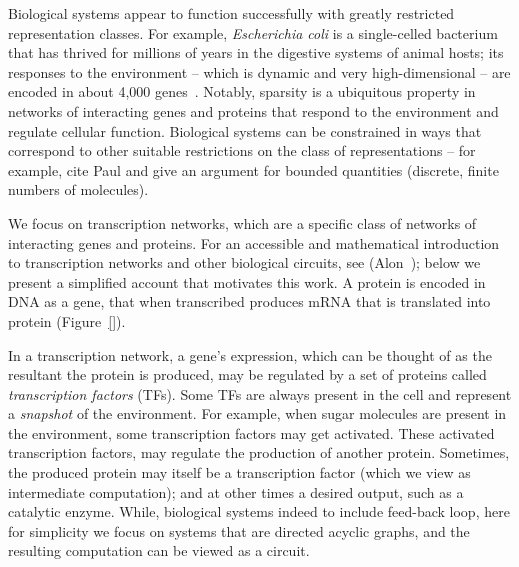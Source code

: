Biological systems appear to function successfully with greatly restricted
representation classes. For example, \emph{Escherichia coli} is a single-celled
bacterium that has thrived for millions of years in the digestive systems of
animal hosts; its responses to the environment -- which is dynamic and very
high-dimensional -- are encoded in about 4,000 genes~\cite{biology}. Notably,
sparsity is a ubiquitous property in networks of interacting genes and proteins
that respond to the environment and regulate cellular function.  Biological
systems can be constrained in ways that correspond to other suitable
restrictions on the class of representations -- for example, cite Paul and give
an argument for bounded quantities (discrete, finite numbers of molecules).

We focus on transcription networks, which are a specific class of networks of
interacting genes and proteins. For an accessible and mathematical introduction to
transcription networks and other biological circuits, see (Alon~\cite{alon});
below we present a simplified account that motivates this work. A protein is
encoded in DNA as a gene, that when transcribed produces mRNA that is translated
into protein (Figure~\ref{}).


In a transcription network, a gene's expression, which can be thought of as the
 resultant the protein is produced, may be
regulated by a set of proteins called \emph{transcription factors} (TFs). Some
TFs are always present in the cell and represent a \emph{snapshot} of the
environment. For example, when sugar molecules are present in the environment,
some transcription factors may get activated. These activated transcription
factors, may regulate the production of another protein. Sometimes, the produced
protein may itself be a transcription factor (which we view as intermediate
computation); and at other times a desired output, such as a catalytic enzyme.
While, biological systems indeed to include feed-back loop, here for simplicity
we focus on systems that are directed acyclic graphs, and the resulting
computation can be viewed as a circuit.

